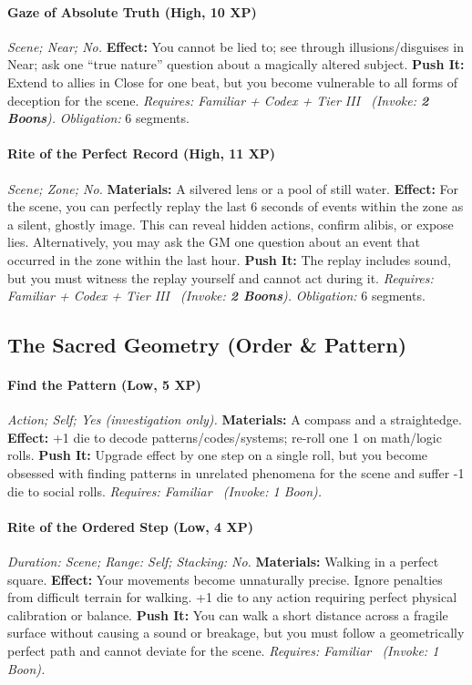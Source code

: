 \documentclass[12pt,twoside]{book}
\begin{document}
\paragraph{Gaze of Absolute Truth (High, 10 XP)} \emph{Scene; Near; No.}
\textbf{Effect:} You cannot be lied to; see through illusions/disguises in Near; ask one ``true nature'' question about a magically altered subject.
\textbf{Push It:} Extend to allies in Close for one beat, but you become vulnerable to all forms of deception for the scene.
\emph{Requires: Familiar + Codex + Tier III \ (\textit{Invoke:} \textbf{2 Boons}).}
\emph{Obligation:} 6 segments.

\paragraph{Rite of the Perfect Record (High, 11 XP)} \emph{Scene; Zone; No.}
\textbf{Materials:} A silvered lens or a pool of still water.
\textbf{Effect:} For the scene, you can perfectly replay the last 6 seconds of events within the zone as a silent, ghostly image. This can reveal hidden actions, confirm alibis, or expose lies. Alternatively, you may ask the GM one question about an event that occurred in the zone within the last hour.
\textbf{Push It:} The replay includes sound, but you must witness the replay yourself and cannot act during it.
\emph{Requires: Familiar + Codex + Tier III \ (\textit{Invoke:} \textbf{2 Boons}).}
\emph{Obligation:} 6 segments.

\subsection{The Sacred Geometry (Order \& Pattern)}
\paragraph{Find the Pattern (Low, 5 XP)} \emph{Action; Self; Yes (investigation only).}
\textbf{Materials:} A compass and a straightedge.
\textbf{Effect:} +1 die to decode patterns/codes/systems; re-roll one 1 on math/logic rolls.
\textbf{Push It:} Upgrade effect by one step on a single roll, but you become obsessed with finding patterns in unrelated phenomena for the scene and suffer -1 die to social rolls.
\emph{Requires: Familiar \ (\textit{Invoke:} 1 Boon).}
\paragraph{Rite of the Ordered Step (Low, 4 XP)} \emph{Duration: Scene; Range: Self; Stacking: No.}
\textbf{Materials:} Walking in a perfect square.
\textbf{Effect:} Your movements become unnaturally precise. Ignore penalties from difficult terrain for walking. +1 die to any action requiring perfect physical calibration or balance.
\textbf{Push It:} You can walk a short distance across a fragile surface without causing a sound or breakage, but you must follow a geometrically perfect path and cannot deviate for the scene.
\emph{Requires: Familiar \ (\textit{Invoke:} 1 Boon).}
\end{document}

